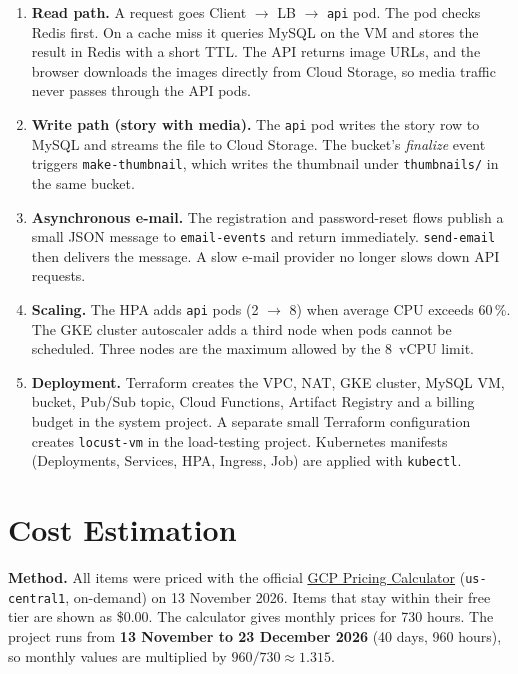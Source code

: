 \documentclass[11pt,a4paper]{article}
\newcommand{\code}[1]{\texttt{#1}}
\begin{document}
\begin{enumerate}
  \item \textbf{Read path.} A request goes Client $\rightarrow$ LB
        $\rightarrow$ \code{api} pod. The pod checks Redis first. On a cache
        miss it queries MySQL on the VM and stores the result in Redis with a
        short TTL. The API returns image URLs, and the browser downloads the
        images directly from Cloud Storage, so media traffic never passes
        through the API pods.
  \item \textbf{Write path (story with media).} The \code{api} pod writes the
        story row to MySQL and streams the file to Cloud Storage. The bucket's
        \emph{finalize} event triggers \code{make-thumbnail}, which writes the
        thumbnail under \code{thumbnails/} in the same bucket.
  \item \textbf{Asynchronous e-mail.} The registration and password-reset
        flows publish a small JSON message to \code{email-events} and return
        immediately. \code{send-email} then delivers the message. A slow
        e-mail provider no longer slows down API requests.
  \item \textbf{Scaling.} The HPA adds \code{api} pods (2 $\rightarrow$ 8)
        when average CPU exceeds 60\,\%. The GKE cluster autoscaler adds a
        third node when pods cannot be scheduled. Three nodes are the maximum
        allowed by the 8~vCPU limit.
  \item \textbf{Deployment.} Terraform creates the VPC, NAT, GKE cluster, MySQL
        VM, bucket, Pub/Sub topic, Cloud Functions, Artifact Registry and a
        billing budget in the system project. A separate small Terraform
        configuration creates \code{locust-vm} in the load-testing project.
        Kubernetes manifests (Deployments, Services, HPA, Ingress, Job) are
        applied with \code{kubectl}.
\end{enumerate}

\section{Cost Estimation}

\textbf{Method.} All items were priced with the official
\href{https://cloud.google.com/products/calculator}{GCP Pricing Calculator}
(\code{us-central1}, on-demand) on 13 November
2026. Items that stay within their free tier are shown as \$0.00. The
calculator gives monthly prices for 730 hours. The
project runs from \textbf{13 November to 23 December 2026} (40 days, 960
hours), so monthly values are multiplied by $960/730 \approx 1.315$.
\end{document}
